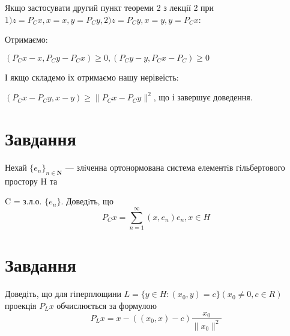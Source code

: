 \documentclass[a4paper]{extreport}
\begin{document}
    Якщо застосувати другий пункт теореми 2 з лекції 2 
    при $1)z = P_Cx, x = x, y = P_Cy, 2)z = P_Cy, x = y, y = P_Cx $:


    Отримаємо:


    $ (P_Cx - x, P_Cy - P_Cx) \geq 0 , (P_Cy - y, P_Cx - P_C) \geq 0$


    І якщо складемо їх отримаємо нашу нерівеість:


    $(P_Cx - P_Cy, x - y) \geq \|P_Cx - P_Cy \|^2  $, що і завершує доведення.



    \chapter{Завдання \theHchapter}


    \begin{tcolorbox}[title=Завдання]
        Нехай $\{e_n\}_{n \in \mathbf{N}} $ — злiченна ортонормована система елементiв 
        гiльбертового простору H та
        
        
        C = з.л.о. $\{e_n\}$. Доведiть, що
        $$ P_Cx = \sum_{n = 1}^{\infty}(x, e_n)e_n, x \in H $$
    \end{tcolorbox}





    \chapter{Завдання \theHchapter}


    \begin{tcolorbox}[title=Завдання]
        
        Доведiть, що для гiперплощини 
        $ L = \{y \in H : (x_0, y) = c\} (x_0 \neq 0, c \in R)$
        проекцiя $P_Lx$ обчислюється за формулою
        $$ P_Lx = x - ((x_0, x) - c) \frac{x_0}{\| x_0 \| ^ 2} $$
        
    \end{tcolorbox}

\end{document}

